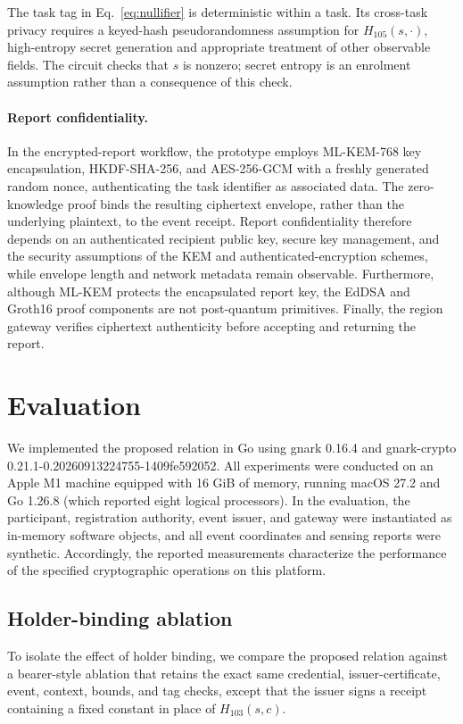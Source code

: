 \documentclass[pdflatex,iicol,sn-mathphys-num]{sn-jnl}
\begin{document}
The task tag in Eq.~\eqref{eq:nullifier} is deterministic within a task. Its cross-task privacy requires a keyed-hash pseudorandomness assumption for $H_{105}(s,\cdot)$, high-entropy secret generation and appropriate treatment of other observable fields. The circuit checks that $s$ is nonzero; secret entropy is an enrolment assumption rather than a consequence of this check.

\paragraph{Report confidentiality.} In the encrypted-report workflow, the prototype employs ML-KEM-768 key encapsulation, HKDF-SHA-256, and AES-256-GCM with a freshly generated random nonce, authenticating the task identifier as associated data. The zero-knowledge proof binds the resulting ciphertext envelope, rather than the underlying plaintext, to the event receipt. Report confidentiality therefore depends on an authenticated recipient public key, secure key management, and the security assumptions of the KEM and authenticated-encryption schemes, while envelope length and network metadata remain observable. Furthermore, although ML-KEM protects the encapsulated report key, the EdDSA and Groth16 proof components are not post-quantum primitives. Finally, the region gateway verifies ciphertext authenticity before accepting and returning the report.


\section{Evaluation}
\label{sec:evaluation}

We implemented the proposed relation in Go using gnark 0.16.4 and gnark-crypto 0.21.1-0.20260913224755-1409fe592052. All experiments were conducted on an Apple M1 machine equipped with 16 GiB of memory, running macOS 27.2 and Go 1.26.8 (which reported eight logical processors). In the evaluation, the participant, registration authority, event issuer, and gateway were instantiated as in-memory software objects, and all event coordinates and sensing reports were synthetic. Accordingly, the reported measurements characterize the performance of the specified cryptographic operations on this platform.

\subsection{Holder-binding ablation}
To isolate the effect of holder binding, we compare the proposed relation against a bearer-style ablation that retains the exact same credential, issuer-certificate, event, context, bounds, and tag checks, except that the issuer signs a receipt containing a fixed constant in place of $H_{103}(s,c)$.
\end{document}
